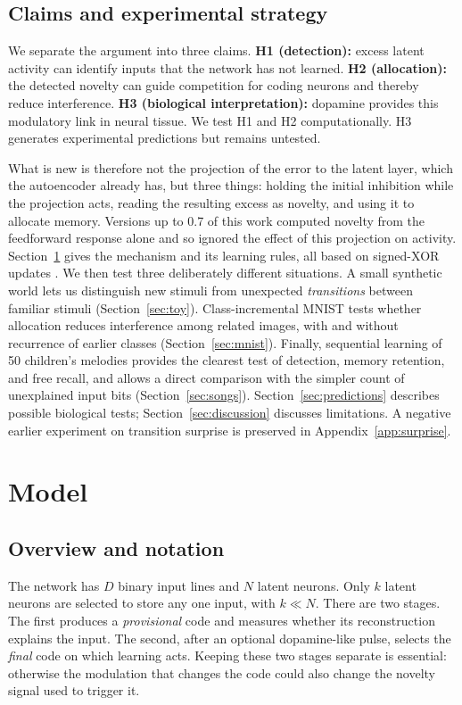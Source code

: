 \documentclass[11pt,a4paper]{article}
\begin{document}
\subsection*{Claims and experimental strategy}
We separate the argument into three claims. \textbf{H1 (detection):} excess latent activity can identify inputs that the network has not learned. \textbf{H2 (allocation):} the detected novelty can guide competition for coding neurons and thereby reduce interference. \textbf{H3 (biological interpretation):} dopamine provides this modulatory link in neural tissue. We test H1 and H2 computationally. H3 generates experimental predictions but remains untested.

What is new is therefore not the projection of the error to the latent layer, which the autoencoder already has, but three things: holding the initial inhibition while the projection acts, reading the resulting excess as novelty, and using it to allocate memory. Versions up to 0.7 of this work computed novelty from the feedforward response alone and so ignored the effect of this projection on activity. Section~\ref{sec:model} gives the mechanism and its learning rules, all based on signed-XOR updates \citep{pena2026motif,pena2026loss}. We then test three deliberately different situations. A small synthetic world lets us distinguish new stimuli from unexpected \emph{transitions} between familiar stimuli (Section~\ref{sec:toy}). Class-incremental MNIST tests whether allocation reduces interference among related images, with and without recurrence of earlier classes (Section~\ref{sec:mnist}). Finally, sequential learning of 50 children's melodies \citep{pena2026songs} provides the clearest test of detection, memory retention, and free recall, and allows a direct comparison with the simpler count of unexplained input bits (Section~\ref{sec:songs}). Section~\ref{sec:predictions} describes possible biological tests; Section~\ref{sec:discussion} discusses limitations. A negative earlier experiment on transition surprise is preserved in Appendix~\ref{app:surprise}.

\section{Model}\label{sec:model}

\subsection{Overview and notation}
The network has $D$ binary input lines and $N$ latent neurons. Only $k$ latent neurons are selected to store any one input, with $k\ll N$. There are two stages. The first produces a \emph{provisional} code and measures whether its reconstruction explains the input. The second, after an optional dopamine-like pulse, selects the \emph{final} code on which learning acts. Keeping these two stages separate is essential: otherwise the modulation that changes the code could also change the novelty signal used to trigger it.
\end{document}
